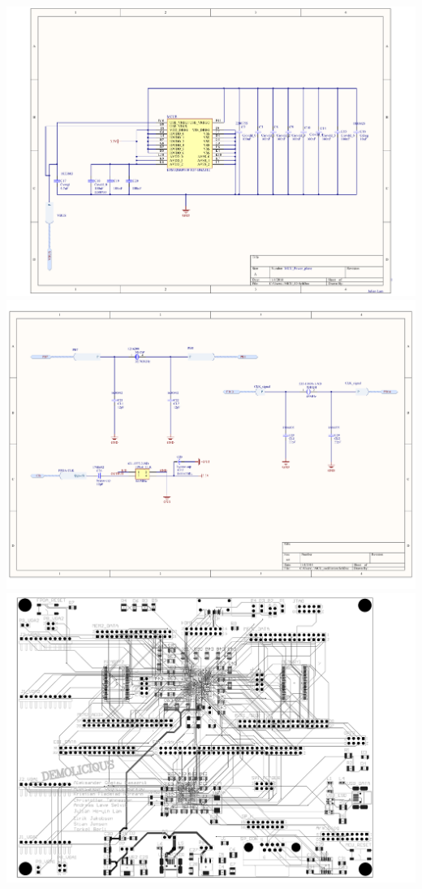 \documentclass[../main/report.tex]{subfiles}
\begin{document}
\newpage
\includegraphics[width=\paperwidth]{../appendix/PCB_schematics/MCU_IO.PDF}
\newpage
\includegraphics[width=\paperwidth]{../appendix/PCB_schematics/MCU_oscilliation.PDF}
\newpage
\includegraphics[width=\paperwidth]{../appendix/PCB_schematics/PCB-15_19_prototyp1.PDF}
\end{document}
